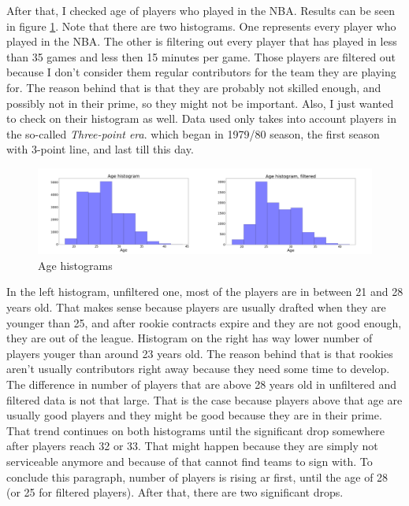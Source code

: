 \documentclass[a4paper]{article}
\begin{document}
After that, I checked age of players who played in the NBA. Results can be seen in figure \ref{plt:age_hist}. Note that there are two histograms. One represents every player who played in the NBA. The other is filtering out every player that has played in less than 35 games and less then 15 minutes per game. Those players are filtered out because I don't consider them regular contributors for the team they are playing for. The reason behind that is that they are probably not skilled enough, and possibly not in their prime, so they might not be important. Also, I just wanted to check on their histogram as well. Data used only takes into account players in the so-called \textit{Three-point era}. which began in 1979/80 season, the first season with 3-point line, and last till this day.

\begin{figure}[h!]
\begin{center}
\includegraphics[scale=0.3]{age_histograms.png}
\end{center}
\caption{Age histograms}
\label{plt:age_hist}
\end{figure}


In the left histogram, unfiltered one, most of the players are in between 21 and 28 years old. That makes sense because players are usually drafted when they are younger than 25, and after rookie contracts expire and they are not good enough, they are out of the league. Histogram on the right has way lower number of players youger than around 23 years old. The reason behind that is that rookies aren't usually contributors right away because they need some time to develop.   The difference in number of players that are above 28 years old in unfiltered and filtered data is not that large. That is the case because players above that age are usually good players and they might be good because they are in their prime. That trend continues on both histograms until the significant drop somewhere after players reach 32 or 33. That might happen because they are simply not serviceable anymore and because of that cannot find teams to sign with. To conclude this paragraph, number of players is rising ar first, until the age of 28 (or 25 for filtered players). After that, there are two significant drops.
\end{document}
